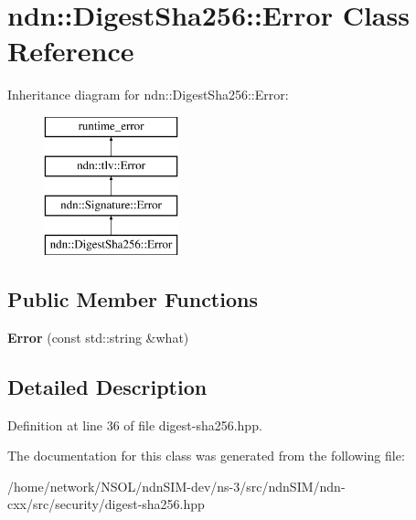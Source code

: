 \hypertarget{classndn_1_1DigestSha256_1_1Error}{}\section{ndn\+:\+:Digest\+Sha256\+:\+:Error Class Reference}
\label{classndn_1_1DigestSha256_1_1Error}
Inheritance diagram for ndn\+:\+:Digest\+Sha256\+:\+:Error\+:\begin{figure}[H]
\begin{center}
\leavevmode
\includegraphics[height=4.000000cm]{classndn_1_1DigestSha256_1_1Error}
\end{center}
\end{figure}
\subsection*{Public Member Functions}
\begin{DoxyCompactItemize}
\item 
{\bfseries Error} (const std\+::string \&what)\hypertarget{classndn_1_1DigestSha256_1_1Error_a72870dbe00d8236007636612d6955c05}{}\label{classndn_1_1DigestSha256_1_1Error_a72870dbe00d8236007636612d6955c05}

\end{DoxyCompactItemize}


\subsection{Detailed Description}


Definition at line 36 of file digest-\/sha256.\+hpp.



The documentation for this class was generated from the following file\+:\begin{DoxyCompactItemize}
\item 
/home/network/\+N\+S\+O\+L/ndn\+S\+I\+M-\/dev/ns-\/3/src/ndn\+S\+I\+M/ndn-\/cxx/src/security/digest-\/sha256.\+hpp\end{DoxyCompactItemize}
